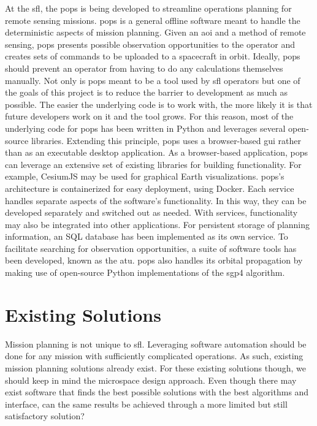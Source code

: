 At the \gls{sfl}, the \gls{pops} is being developed to streamline operations
planning for remote sensing missions. \gls{pops} is a general offline software
meant to handle the deterministic aspects of mission planning.  Given an
\gls{aoi} and a method of remote sensing, \gls{pops} presents possible
observation opportunities to the operator and creates sets of commands to be
uploaded to a spacecraft in orbit.  Ideally, \gls{pops} should prevent an
operator from having to do any calculations themselves manually. Not only is
\gls{pops} meant to be a tool used by \gls{sfl} operators but one of the goals
of this project is to reduce the barrier to development as much as possible.
The easier the underlying code is to work with, the more likely it is that
future developers work on it and the tool grows. For this reason, most of the
underlying code for \gls{pops} has been written in Python and leverages several
open-source libraries.  Extending this principle, \gls{pops} uses a
browser-based \gls{gui} rather than as an executable desktop application. As a
browser-based application, \gls{pops} can leverage an extensive set of existing
libraries for building functionality.  For example, CesiumJS may be used for
graphical Earth visualizations.  \gls{pops}’s architecture is containerized for
easy deployment, using Docker.  Each service handles separate aspects of the
software’s functionality.  In this way, they can be developed separately and
switched out as needed. With services, functionality may also be integrated
into other applications. For persistent storage of planning information, an SQL
database has been implemented as its own service.  To facilitate searching for
observation opportunities, a suite of software tools has been developed, known
as the \gls{atu}.  \gls{pops} also handles its orbital propagation by making
use of open-source Python implementations of the \gls{sgp4} algorithm. 


\section{Existing Solutions}\label{sec:exsoln}

Mission planning is not unique to \gls{sfl}. Leveraging software automation
should be done for any mission with sufficiently complicated operations.  As
such, existing mission planning solutions already exist. For these existing
solutions though, we should keep in mind the microspace design approach. Even
though there may exist software that finds the best possible solutions with the
best algorithms and interface, can the same results be achieved through a more
limited but still satisfactory solution? 


